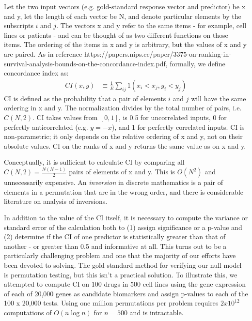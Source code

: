 \documentclass{article}
\begin{document}
Let the two input vectors (e.g. gold-standard response vector and predictor) be x and y, let the length of each vector be N, and denote particular elements by the subscripts $i$ and $j$.  The vectors x and y refer to the same items - for example, cell lines or patients - and can be thought of as two different functions on those items.  The ordering of the items in x and y is arbitrary, but the values of x and y are paired.  As in reference https://papers.nips.cc/paper/3375-on-ranking-in-survival-analysis-bounds-on-the-concordance-index.pdf, formally, we define concordance index as:
\begin{align}
CI(x,y) &\equiv \frac{1}{E}\sum_{ij}1(x_{i} < x_{j}, y_{i} < y_{j})
\end{align}
CI is defined as the probability that a pair of elements $i$ and $j$ will have the same ordering in x and y.  The normalization divides by the total number of pairs, i.e. $C(N,2)$.  CI takes values from $[0,1]$, is 0.5 for uncorrelated inputs, 0 for perfectly anticorrelated (e.g. $y = -x$), and 1 for perfectly correlated inputs.  CI is non-parametric; it only depends on the relative ordering of x and y, not on their absolute values.  CI on the ranks of x and y returns the same value as on x and y. 

Conceptually, it is sufficient to calculate CI by comparing all $C(N,2) = \frac{N(N-1)}{2}$ pairs of elements of x and y.  This is $O(N^{2})$ and unnecessarily expensive.  An \textit{inversion} in discrete mathematics is a pair of elements in a permutation that are in the wrong order, and there is considerable literature on analysis of inversions.  

In addition to the value of the CI itself, it is necessary to compute the variance or standard error of the calculation both to (1) assign significance or a p-value and (2) determine if the CI of one predictor is statistically greater than that of another - or greater than 0.5 and informative at all.  This turns out to be a particularly challenging problem and one that the majority of our efforts have been devoted to solving.  The gold standard method for verifying our null model is permutation testing, but this isn't a practical solution.  To illustrate this, we attempted to compute CI on 100 drugs in 500 cell lines using the gene expression of each of 20,000 genes as candidate biomarkers and assign p-values to each of the 100 x 20,000 tests.  Using one million permutations per problem requires $2x10^{12}$ computations of $O(n \log n)$ for $n=500$ and is intractable.  
\end{document}
